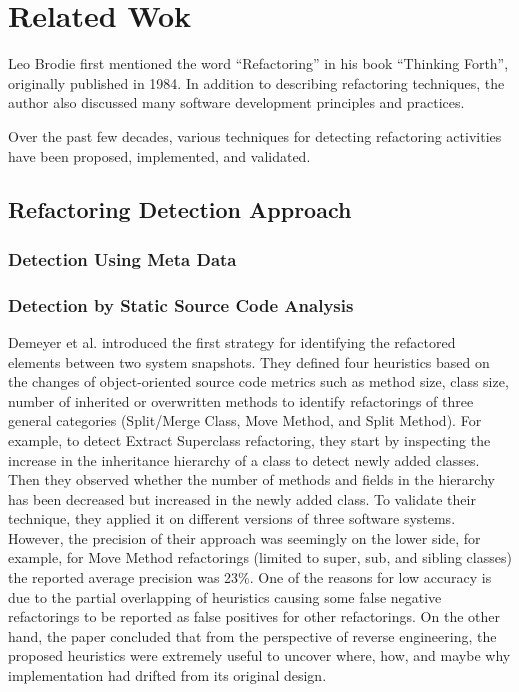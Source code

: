 \documentclass[letterpaper,12pt,onecolumn,final]{report}
\begin{document}
\chapter{Related Wok}
\label{chap:background}

Leo Brodie \cite{thinkingforth} first mentioned the word “Refactoring” in his book “Thinking Forth”, originally published in 1984. In addition to describing refactoring techniques, the author also discussed many software development principles and practices. 

Over the past few decades, various techniques for detecting refactoring activities have been proposed, implemented, and validated.

\section{Refactoring Detection Approach}
\subsection{Detection Using Meta Data}
\subsection{Detection by Static Source Code Analysis}
Demeyer et al. \cite{Demeyer2000} introduced the first strategy for identifying the refactored elements between two system snapshots. They defined four heuristics based on the changes of object-oriented source code metrics such as method size, class size, number of inherited or overwritten methods to identify refactorings of three general categories (Split/Merge Class, Move Method, and Split Method). For example, to detect Extract Superclass refactoring, they start by inspecting the increase in the inheritance hierarchy of a class to detect newly added classes. Then they observed whether the number of methods and fields in the hierarchy has been decreased but increased in the newly added class. To validate their technique, they applied it on different versions of three software systems. However, the precision of their approach was seemingly on the lower side, for example, for Move Method refactorings (limited to super, sub, and sibling classes) the reported average precision was 23\%. One of the reasons for low accuracy is due to the partial overlapping of heuristics causing some false negative refactorings to be reported as false positives for other refactorings. On the other hand, the paper concluded that from the perspective of reverse engineering, the proposed heuristics were extremely useful to uncover where, how, and maybe why implementation had drifted from its original design.
\end{document}
